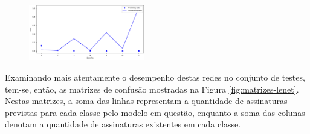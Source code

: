 \begin{figure}[H]
{	\includegraphics[width=0.45\textwidth]{imgs/approach3-lenet-rmsprop-5-elu-loss}
	}
	\label{fig:treinamento-lenet}
\end{figure}

Examinando mais atentamente o desempenho destas redes no conjunto de testes, tem-se, então, as matrizes de confusão mostradas na Figura \ref{fig:matrizes-lenet}. Nestas matrizes, a soma das linhas representam a quantidade de assinaturas previstas para cada classe pelo modelo em questão, enquanto a soma das colunas denotam a quantidade de assinaturas existentes em cada classe.

